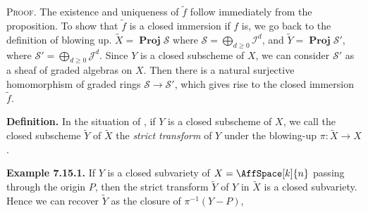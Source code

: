 {\smallskip
\noindent\textsc{Proof.} The existence and uniqueness of $\widetilde f$ follow immediately from the proposition. To show that $\widetilde f$ is a closed immersion if $f$ is, we go back to the definition of blowing up. $\widetilde X=\operatorname{\mathbf{Proj}}\mathcal S$ where $\mathcal S=\bigoplus_{d\geq0}\mathcal I^d$, and $\widetilde Y=\operatorname{\mathbf{Proj}}\mathcal S'$, where $\mathcal S'=\bigoplus_{d\geq0}\mathcal J^d$. Since $Y$ is a closed subscheme of $X$, we can consider $\mathcal S'$ as a sheaf of graded algebras on $X$. Then there is a natural surjective homomorphism of graded rings $\mathcal S\to\mathcal S'$, which gives rise to the closed immersion $\widetilde f$.

\medskip
\noindent\textbf{Definition.} In the situation of , if $Y$ is a closed subscheme of $X$, we call the closed subscheme $\widetilde Y$ of $\widetilde X$ the \emph{strict transform} of $Y$ under the blowing-up $\pi\colon\widetilde X\to X$.

\medskip
\noindent\hypertarget{result-II-7.15.1}{}\textbf{Example 7.15.1.} If $Y$ is a closed subvariety of $X=\AffSpace[k]{n}$ passing through the origin $P$\EditionText{}, then the strict transform $\widetilde Y$ of $Y$ in $\widetilde X$ is a closed subvariety. Hence we can recover $\widetilde Y$ as the closure of $\pi^{-1}(Y-P)$,
}
\usetikzlibrary{arrows}
